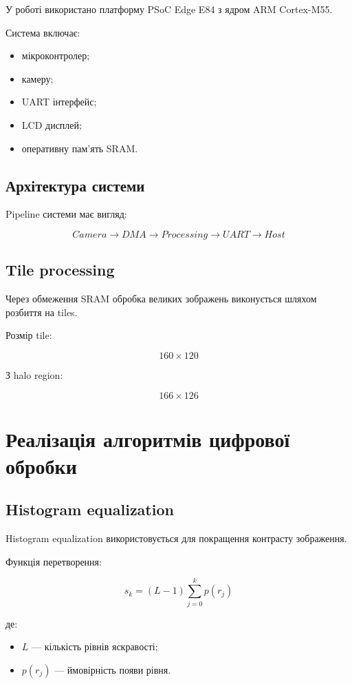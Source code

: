 \documentclass[14pt,a4paper]{extreport}
\begin{document}
У роботі використано платформу PSoC Edge E84
з ядром ARM Cortex-M55.

Система включає:
\begin{itemize}
    \item мікроконтролер;
    \item камеру;
    \item UART інтерфейс;
    \item LCD дисплей;
    \item оперативну пам’ять SRAM.
\end{itemize}

\section{Архітектура системи}

Pipeline системи має вигляд:

\[
Camera \rightarrow DMA \rightarrow Processing
\rightarrow UART \rightarrow Host
\]

\section{Tile processing}

Через обмеження SRAM
обробка великих зображень виконується
шляхом розбиття на tiles.

Розмір tile:

\[
160 \times 120
\]

З halo region:

\[
166 \times 126
\]


\chapter{Реалізація алгоритмів цифрової обробки}

\section{Histogram equalization}

Histogram equalization використовується
для покращення контрасту зображення.

Функція перетворення:

\[
s_k = (L - 1)\sum_{j=0}^{k} p(r_j)
\]

де:
\begin{itemize}
    \item $L$ --- кількість рівнів яскравості;
    \item $p(r_j)$ --- ймовірність появи рівня.
\end{itemize}
\end{document}
